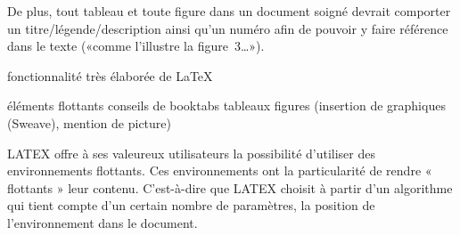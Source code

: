 De plus, tout tableau et toute figure dans un document soigné devrait
comporter un titre/légende/description ainsi qu'un numéro afin de
pouvoir y faire référence dans le texte («comme l'illustre la
figure~3\dots»).

fonctionnalité très élaborée de LaTeX


éléments flottants
conseils de booktabs
tableaux
figures (insertion de graphiques (Sweave), mention de picture)

LATEX offre à ses valeureux utilisateurs la possibilité d'utiliser des environnements flottants. Ces environnements ont la particularité de rendre « flottants » leur contenu. C'est-à-dire que LATEX choisit à partir d'un algorithme qui tient compte d'un certain nombre de paramètres, la position de l'environnement dans le document.

